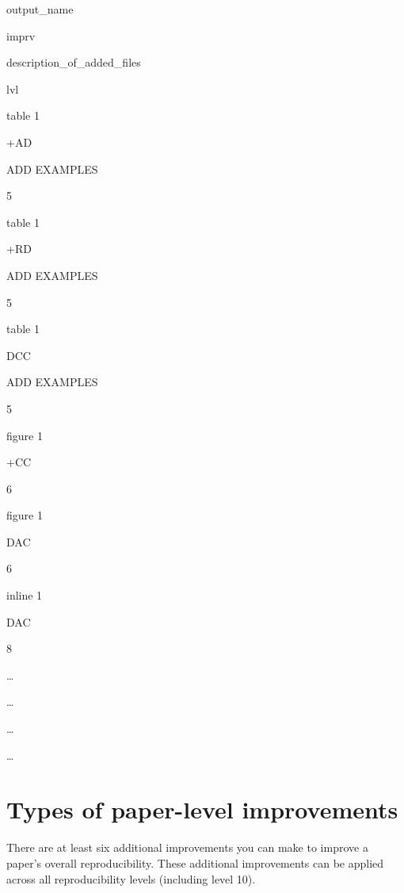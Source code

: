\documentclass[]{book}
\begin{document}
output\_name

imprv

description\_of\_added\_files

lvl

table 1

+AD

ADD EXAMPLES

5

table 1

+RD

ADD EXAMPLES

5

table 1

DCC

ADD EXAMPLES

5

figure 1

+CC

6

figure 1

DAC

6

inline 1

DAC

8

\ldots{}

\ldots{}

\ldots{}

\ldots{}

\hypertarget{paper-level}{%
\section{Types of paper-level improvements}\label{paper-level}}

There are at least six additional improvements you can make to improve a paper's overall reproducibility. These additional improvements can be applied across all reproducibility levels (including level 10).
\end{document}
